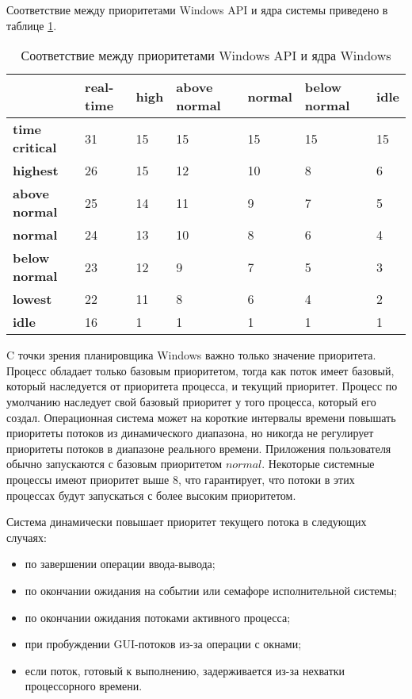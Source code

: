 Соответствие между приоритетами {\ttfamily Windows API} и ядра системы приведено в таблице \ref{tbl:priority}.
\begin{table}[h]
	\caption{Соответствие между приоритетами Windows API и ядра Windows}
	\begin{center}
		\begin{tabular}{|l|p{45pt}|p{45pt}|p{45pt}|p{45pt}|p{45pt}|p{45pt}|} 
			\hline
			{} & \textbf{real-time} & \textbf{high} & \textbf{above normal} & \textbf{normal} & \textbf{below normal} & \textbf{idle}\\
			\hline
			\textbf{time critical} & 31 & 15 & 15 & 15 & 15 & 15 \\
			\hline
			\textbf{highest} & 26 & 15 & 12 & 10 & 8 & 6 \\
			\hline
			\textbf{above normal} & 25 & 14 & 11 & 9 & 7 & 5 \\
			\hline
			\textbf{normal} & 24 & 13 & 10 & 8 & 6 & 4 \\
			\hline
			\textbf{below normal} & 23 & 12 & 9 & 7 & 5 & 3 \\
			\hline
			\textbf{lowest} & 22 & 11 & 8 & 6 & 4 & 2 \\
			\hline
			\textbf{idle} & 16 & 1 & 1 & 1 & 1 & 1 \\
			\hline
		\end{tabular}
	\end{center}
	\label{tbl:priority}
\end{table}

C точки зрения планировщика {\ttfamily Windows} важно только значение приоритета.
Процесс обладает только базовым приоритетом, тогда как поток имеет базовый, который наследуется от приоритета процесса, и текущий приоритет. Процесс по умолчанию наследует свой базовый приоритет у того процесса, который его создал. Операционная система может на короткие интервалы времени повышать приоритеты потоков из динамического диапазона, но никогда не регулирует приоритеты потоков в диапазоне реального времени.
Приложения пользователя обычно запускаются с базовым приоритетом $normal$. Некоторые системные процессы имеют приоритет выше 8, что гарантирует, что потоки в этих процессах будут запускаться с более высоким приоритетом.

Система динамически повышает приоритет текущего потока в следующих случаях:
\begin{itemize}
	\item по завершении операции ввода-вывода;
	\item по окончании ожидания на событии или семафоре исполнительной системы;
	\item по окончании ожидания потоками активного процесса;
	\item при пробуждении {\ttfamily GUI}-потоков из-за операции с окнами;
	\item если поток, готовый к выполнению, задерживается из-за нехватки процессорного времени.
\end{itemize}

